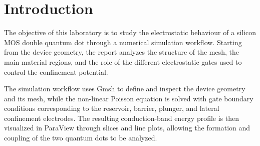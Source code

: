 \chapter{Introduction}

The objective of this laboratory is to study the electrostatic behaviour of a
silicon MOS double quantum dot through a numerical simulation workflow. Starting
from the device geometry, the report analyzes the structure of the mesh, the
main material regions, and the role of the different electrostatic gates used to
control the confinement potential.

The simulation workflow uses Gmsh to define and inspect the device geometry and
its mesh, while the non-linear Poisson equation is solved with gate boundary
conditions corresponding to the reservoir, barrier, plunger, and lateral
confinement electrodes. The resulting conduction-band energy profile is then
visualized in ParaView through slices and line plots, allowing the formation and
coupling of the two quantum dots to be analyzed.
